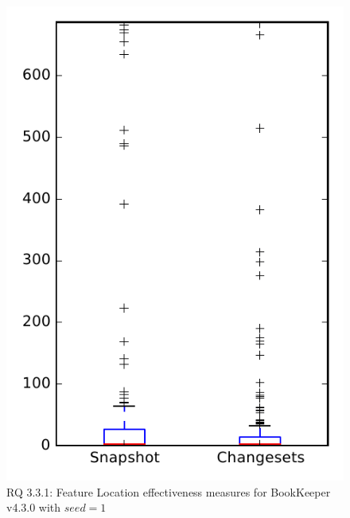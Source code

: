 
\begin{figure}
\centering
\includegraphics[height=0.4\textheight]{figures/flt_seed/rq1_bookkeeper_1}
\caption{RQ 3.3.1: Feature Location effectiveness measures for BookKeeper v4.3.0 with $seed=1$}
\label{fig:flt_seed:rq1:bookkeeper}
\end{figure}
